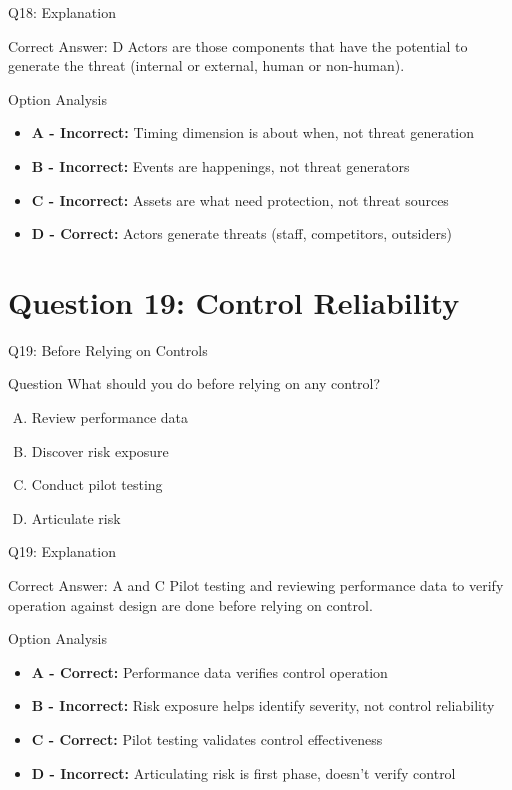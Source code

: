 \documentclass{beamer}
\begin{document}
	\begin{frame}{Q18: Explanation}
		\begin{block}{Correct Answer: D}
			Actors are those components that have the potential to generate the threat (internal or external, human or non-human).
		\end{block}
		\begin{block}{Option Analysis}
			\begin{itemize}
				\item \textbf{A - Incorrect:} Timing dimension is about when, not threat generation
				\item \textbf{B - Incorrect:} Events are happenings, not threat generators
				\item \textbf{C - Incorrect:} Assets are what need protection, not threat sources
				\item \textbf{D - Correct:} Actors generate threats (staff, competitors, outsiders)
			\end{itemize}
		\end{block}
	\end{frame}
	
	\section{Question 19: Control Reliability}
	
	\begin{frame}{Q19: Before Relying on Controls}
		\begin{block}{Question}
			What should you do before relying on any control?
		\end{block}
		\begin{enumerate}[(A)]
			\item Review performance data
			\item Discover risk exposure
			\item Conduct pilot testing
			\item Articulate risk
		\end{enumerate}
	\end{frame}
	
	\begin{frame}{Q19: Explanation}
		\begin{block}{Correct Answer: A and C}
			Pilot testing and reviewing performance data to verify operation against design are done before relying on control.
		\end{block}
		\begin{block}{Option Analysis}
			\begin{itemize}
				\item \textbf{A - Correct:} Performance data verifies control operation
				\item \textbf{B - Incorrect:} Risk exposure helps identify severity, not control reliability
				\item \textbf{C - Correct:} Pilot testing validates control effectiveness
				\item \textbf{D - Incorrect:} Articulating risk is first phase, doesn't verify control
			\end{itemize}
		\end{block}
	\end{frame}
	
\end{document}
